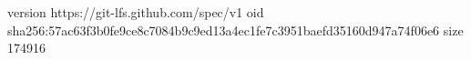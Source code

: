 version https://git-lfs.github.com/spec/v1
oid sha256:57ac63f3b0fe9ce8c7084b9c9ed13a4ec1fe7c3951baefd35160d947a74f06e6
size 174916
